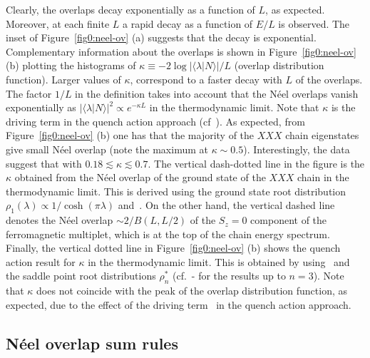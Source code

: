 \documentclass[11pt]{iopart}
\begin{document}
Clearly, the overlaps decay exponentially as a function of $L$, as expected. Moreover, 
at each finite $L$ a rapid decay as a function of $E/L$ is observed. The inset of 
Figure~\ref{fig0:neel-ov} (a) suggests that the decay is exponential. Complementary 
information about the overlaps is shown in Figure~\ref{fig0:neel-ov} (b) plotting the 
histograms of $\kappa\equiv-2\log|\langle\lambda|N\rangle|/L$ (overlap distribution 
function). Larger values of $\kappa$, correspond to a faster decay with $L$ of the 
overlaps. The factor $1/L$ in the definition takes into account that the N\'eel 
overlaps vanish exponentially as $|\langle\lambda|N\rangle|^2\propto e^{-\kappa L}$ in 
the thermodynamic limit. Note that $\kappa$ is the driving term in the quench action 
approach (cf~). As expected, from Figure~\ref{fig0:neel-ov} (b) one 
has that the majority of the $XXX$ chain eigenstates give small N\'eel overlap (note 
the maximum at $\kappa\sim 0.5$). Interestingly, the data suggest that with 
$0.18\lesssim\kappa\lesssim0.7$. The vertical dash-dotted line in the figure is 
the $\kappa$ obtained from the N\'eel overlap of the ground state of the $XXX$ 
chain in the thermodynamic limit. This is derived using the ground state root 
distribution $\rho_1(\lambda)\propto1/\cosh(\pi\lambda)$ and~. 
On the other hand, the vertical dashed line denotes the N\'eel overlap $\sim 2/B(L,L/2)$ 
of the $S_z=0$ component of the ferromagnetic multiplet, which is at the top of the
chain energy spectrum. Finally, the vertical dotted line in Figure~\ref{fig0:neel-ov} 
(b) shows the quench action result for $\kappa$ in the thermodynamic limit. This is 
obtained by using~ and the saddle point root distributions $\rho_n^*$ 
(cf.~- for the results up to $n=3$). Note that $\kappa$ 
does not coincide with the peak of the overlap distribution function, as expected, 
due to the effect of the driving term~ in the quench action approach. 

\subsection{N\'eel overlap sum rules}
\label{sec:5.2}
\end{document}
